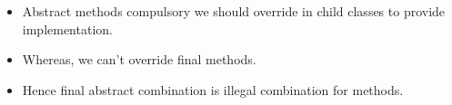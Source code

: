 \setlength{\columnsep}{3pt}
\begin{flushleft}
	
	\begin{itemize}
		\item Abstract methods compulsory we should override in child classes to provide implementation.
		\item Whereas, we can’t override final methods. 
		\item Hence final abstract combination is illegal combination for methods.
	\end{itemize}	
	
\end{flushleft}

\newpage

